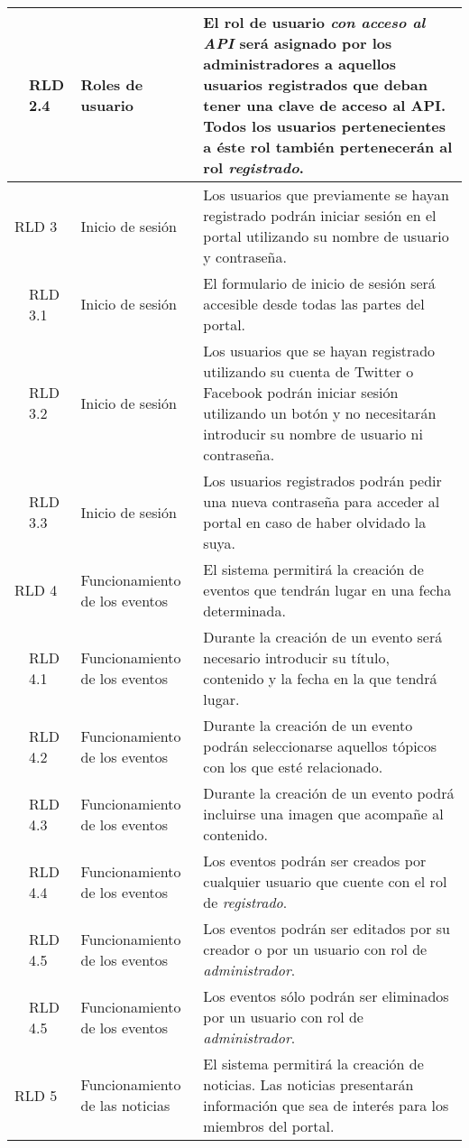 \begin{longtable}[c]{|p{1mm}|p{14mm}|p{30mm}|p{90mm}|}
\hline
& RLD 2.4 & Roles de usuario & El rol de usuario \textit{con acceso al API} será asignado por los administradores a aquellos usuarios registrados que deban tener una clave de acceso al API.  Todos los usuarios pertenecientes a éste rol también pertenecerán al rol \textit{registrado}. \\
\hline
\multicolumn{2}{|l|}{RLD 3} & Inicio de sesión & Los usuarios que previamente se hayan registrado podrán iniciar sesión en el portal utilizando su nombre de usuario y contraseña. \\
\hline
& RLD 3.1 & Inicio de sesión & El formulario de inicio de sesión será accesible desde todas las partes del portal. \\
\hline
& RLD 3.2 & Inicio de sesión & Los usuarios que se hayan registrado utilizando su cuenta de Twitter o Facebook podrán iniciar sesión utilizando un botón y no necesitarán introducir su nombre de usuario ni contraseña. \\
\hline
& RLD 3.3 & Inicio de sesión & Los usuarios registrados podrán pedir una nueva contraseña para acceder al portal en caso de haber olvidado la suya. \\
\hline
\multicolumn{2}{|l|}{RLD 4} & Funcionamiento de los eventos & El sistema permitirá la creación de eventos que tendrán lugar en una fecha determinada. \\
\hline
& RLD 4.1 & Funcionamiento de los eventos & Durante la creación de un evento será necesario introducir su título, contenido y la fecha en la que tendrá lugar. \\
\hline
& RLD 4.2 & Funcionamiento de los eventos & Durante la creación de un evento podrán seleccionarse aquellos tópicos con los que esté relacionado. \\
\hline
& RLD 4.3 & Funcionamiento de los eventos & Durante la creación de un evento podrá incluirse una imagen que acompañe al contenido. \\
\hline
& RLD 4.4 & Funcionamiento de los eventos & Los eventos podrán ser creados por cualquier usuario que cuente con el rol de \textit{registrado}. \\
\hline
& RLD 4.5 & Funcionamiento de los eventos & Los eventos podrán ser editados por su creador o por un usuario con rol de \textit{administrador}. \\
\hline
& RLD 4.5 & Funcionamiento de los eventos & Los eventos sólo podrán ser eliminados por un usuario con rol de \textit{administrador}. \\
\hline
\multicolumn{2}{|l|}{RLD 5} & Funcionamiento de las noticias & El sistema permitirá la creación de noticias.  Las noticias presentarán información que sea de interés para los miembros del portal. \\

\end{longtable}
